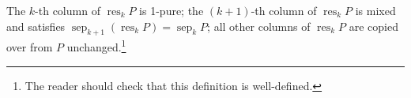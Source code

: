 \documentclass[numbers=enddot,12pt,final,onecolumn,notitlepage]{scrartcl}%
\theoremstyle{definition}
\begin{document}
\begin{itemize}
The $k$-th column of $\operatorname*{res}_{k}P$ is 1-pure; the $\left(  k+1\right)  $-th column of $\operatorname*{res}%
\nolimits_{k}P$ is mixed and satisfies $\operatorname*{sep}\nolimits_{k+1}%
\left(  \operatorname*{res}\nolimits_{k}P\right)  =\operatorname*{sep}%
\nolimits_{k}P$; all other columns of $\operatorname*{res}\nolimits_{k}P$ are
copied over from $P$ unchanged.\footnote{The reader should check that this
definition is well-defined.
}


\end{itemize}
\end{document}
